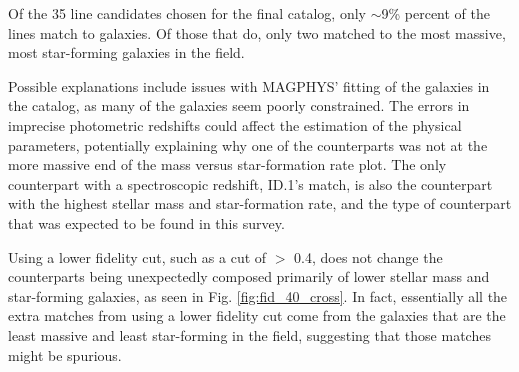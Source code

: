 Of the 35 line candidates chosen for the final catalog, only $\sim$9\% percent of the lines match to galaxies. Of those that do, only two matched to the most massive, most star-forming galaxies in the field. 

Possible explanations include issues with MAGPHYS' fitting of the galaxies in the catalog, as many of the galaxies seem poorly constrained. The errors in imprecise photometric redshifts could affect the estimation of the physical parameters, potentially explaining why one of the counterparts was not at the more massive end of the mass versus star-formation rate plot. The only counterpart with a spectroscopic redshift, ID.1's match, is also the counterpart with the highest stellar mass and star-formation rate, and the type of counterpart that was expected to be found in this survey.

Using a lower fidelity cut, such as a cut of $>$ 0.4, does not change the counterparts being unexpectedly composed primarily of lower stellar mass and star-forming galaxies, as seen in Fig. \ref{fig:fid_40_cross}. In fact, essentially all the extra matches from using a lower fidelity cut come from the galaxies that are the least massive and least star-forming in the field, suggesting that those matches might be spurious.

